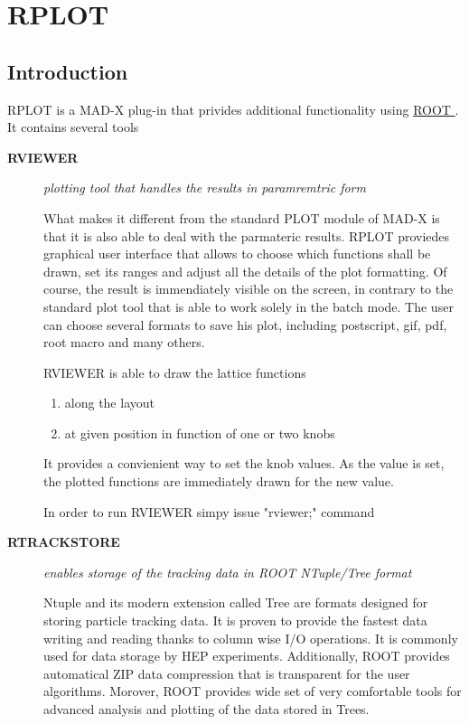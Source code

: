
\section{RPLOT}

\subsection{Introduction}  
RPLOT is a MAD-X plug-in that privides additional functionality using
\href{http://root.cern.ch}{ ROOT }.  It contains several tools   

\begin{description}

\item[\textbf{ RVIEWER }] 
\textit{ plotting tool that handles the results in paramremtric form }

What makes it different      from the standard PLOT module of MAD-X is
that it is also able to      deal with the parmateric results. RPLOT
proviedes graphical user interface      that allows to choose which
functions shall be drawn, set its ranges     and adjust all the details
of the plot formatting. Of course, the result     is immendiately
visible on the screen, in contrary to the standard plot tool     that is
able to work solely in the batch mode. The user can choose several
formats to save his plot, including postscript, gif, pdf, root macro and
many      others.       

RVIEWER is able to draw the lattice functions     
\begin{enumerate}
   \item  along the layout 
   \item  at given position in function of one or two knobs  
\end{enumerate}     

It provides a convienient way to set the knob values. As the value is
set,      the plotted functions are immediately drawn for the new value.            

In order to run RVIEWER simpy issue "rviewer;" command        

\item[\textbf{ RTRACKSTORE }] 
\textit{ enables storage of the tracking data in ROOT NTuple/Tree format }

Ntuple and its modern extension called Tree are formats designed
for storing particle tracking data. It is proven to provide       the
fastest data writing and reading thanks to column wise       I/O
operations. It is commonly used for data storage by HEP
experiments. Additionally, ROOT provides automatical        ZIP data
compression that is transparent for the user algorithms.
Morover, ROOT provides wide set of very comfortable tools       for
advanced analysis and plotting of the data stored in Trees.    


\end{description}
